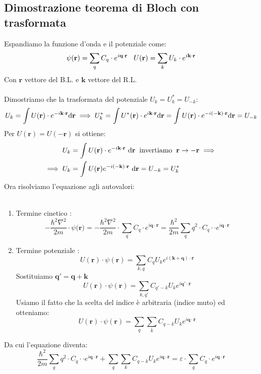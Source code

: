 \subsection{Dimostrazione teorema di Bloch con trasformata}
Espandiamo la funzione d'onda e il potenziale come:
\[\psi(\mathbf{r})= \sum_q C_q\cdot e^{i\mathbf{q}\cdot \mathbf{r}} \hspace{0.3cm} U(\mathbf{r})= \sum_k U_k\cdot e^{i\mathbf{k}\cdot \mathbf{r}}\]
Con $\mathbf{r}$ vettore del B.L. e $\mathbf{k}$ vettore del R.L.\\\\
Dimostriamo che la trasformata del potenziale $U_k = U^*_k = U_{-k}$:
\[U_k = \int U(\mathbf{r}) \cdot e^{-i\mathbf{k}\cdot \mathbf{r}}\text{d}\mathbf{r} \implies U^*_k = \int U^*(\mathbf{r}) \cdot e^{i\mathbf{k}\cdot \mathbf{r}}\text{d}\mathbf{r} =  \int U(\mathbf{r}) \cdot e^{-i(-\mathbf{k})\cdot \mathbf{r}}\text{d}\mathbf{r} = U_{-k}\]
Per $U(\mathbf{r}) = U(-\mathbf{r})$ si ottiene:
\begin{align*}
	U_k &= \int U(\mathbf{r}) \cdot e^{-i\mathbf{k}\cdot \mathbf{r}}\ \text{d}\mathbf{r} \hspace{0.2cm}\text{invertiamo} \hspace{0.2cm} \mathbf{r} \to -\mathbf{r} \implies\\ 
	\implies U_k &= \int U(\mathbf{r}) e^{-i(\mathbf{-k})\cdot \mathbf{r}}\ \text{d}\mathbf{r}= U_{-k} = U_k^*
\end{align*}
Ora risolviamo l'equazione agli autovalori:\\\\
\begin{enumerate}
    \item Termine cinetico :
    \[-\frac{\hbar^2\nabla^2}{2m}\cdot \psi(\mathbf{r)} =-\frac{\hbar^2\nabla^2}{2m}\cdot \sum_q C_q\cdot e^{i\mathbf{q}\cdot \mathbf{r}} = \frac{\hbar^2}{2m}\sum_q q^2 \cdot C_q\cdot \cdot e^{i\mathbf{q}\cdot \mathbf{r}}\]
    \item Termine potenziale :
    \[U(\mathbf{r}) \cdot \psi(\mathbf{r}) = \sum_{k,q} C_q U_k e^{i(\mathbf{k}+\mathbf{q})\cdot \mathbf{r}}\]
    Sostituiamo $\mathbf{q'} = \mathbf{q}+\mathbf{k}$
    \[U(\mathbf{r}) \cdot \psi(\mathbf{r}) = \sum_{k,q'} C_{q'-k} U_k e^{i\mathbf{q'\cdot r}}\]
    Usiamo il fatto che la scelta del indice è arbitraria (indice muto) ed otteniamo:
    \[U(\mathbf{r}) \cdot \psi(\mathbf{r}) = \sum_q \sum_k C_{q-k} U_k e^{i\mathbf{q\cdot r}}\]
\end{enumerate}
Da cui l'equazione diventa:
\[\frac{\hbar^2}{2m}\sum_q q^2 \cdot C_q\cdot \cdot e^{i\mathbf{q}\cdot \mathbf{r}}+ \sum_q \sum_k C_{q-k} U_k e^{i\mathbf{q\cdot r}} = \varepsilon \cdot \sum_q C_q\cdot e^{i\mathbf{q}\cdot \mathbf{r}}\]

